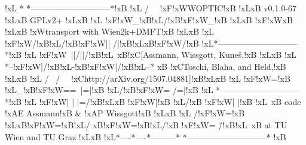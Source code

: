 !xL{}          *    *-----------------------------*!xB{}
!xL{}         / \    \ !xF{}!xW{}WOPTIC!xB{} !xL{}\!xB{} v0.1.0-67 !xL{}\!xB{} GPLv2+ !xL{}\!xB{}
!xL{}       !xF{}!xW{}_!xB{}!xL{}/!xB{}!xF{}!xW{}_!xB{}  !xL{}\!xB{} !xF{}!xW{}\!xB{}  !xL{}\!xB{} !xW{}transport with  Wien2k+DMFT!xB{} !xL{}\!xB{}
!xL{}      !xF{}!xW{}/!xB{}!xL{}/!xB{}!xF{}!xW{}|| /|!xB{}!xL{}\!xB{}!xF{}!xW{}/!xB{}   !xL{}*-----------------------------*!xB{}
!xL{}      !xF{}!xW{}\ ||/||/!xB{}!xL{}\    \!xB{}!xC{}[Assmann,  Wissgott,  Kuneš,!xB{} !xL{}\!xB{}
!xL{}     *--!xF{}!xW{}|/!xB{}!xL{}-!xB{}!xF{}!xW{}|/!xB{}!xL{}--*    \!xB{} !xC{}Toschi,  Blaha,  and  Held,!xB{} !xL{}\!xB{}
!xL{}    / \       / \    \ !xC{}http://arXiv.org/1507.04881]!xB{}!xL{}\!xB{}
!xL{}  !xF{}!xW{}=!xB{} !xL{}_!xB{}!xF{}!xW{}==\ |=|!xB{} !xL{}/!xB{}!xF{}!xW{}= /=|!xB{}  !xL{} *-----------------------------*!xB{}
!xL{} !xF{}!xW{}| | |=/!xB{}!xL{}\!xB{} !xF{}!xW{}|!xB{} !xL{}/!xB{} !xF{}!xW{}| |!xB{} !xL{}\    \!xB{} code !xA{}E Assmann!xB{} & !xA{}P Wissgott!xB{} !xL{}\!xB{}
!xL{} /!xF{}!xW{}=!xB{} !xL{}\!xB{}!xF{}!xW{}=!xB{}!xL{}/  \!xB{}!xF{}!xW{}=!xB{}!xL{}/!xB{}  !xF{}!xW{}= \=/!xB{}!xL{}\    \!xB{} at  TU  Wien  and  TU  Graz !xL{}\!xB{}
!xL{}*----*----*---------*    *-----------------------------*  !xB{}
